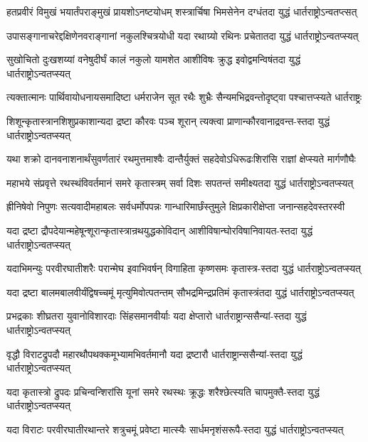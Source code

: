 \twolineshloka
{हतप्रवीरं विमुखं भयार्तंपराङ्मुखं प्रायशोऽनष्टयोधम्}
{शस्त्रार्चिषा भिमसेनेन दग्धंतदा युद्धं धार्तराष्ट्रोऽन्वतप्त्सत्}


\twolineshloka
{उपासङ्गानाचरेद्दक्षिणेनवराङ्गानां नकुलश्चित्रयोधी}
{यदा रथाग्र्यो रथिनः प्रचेतातदा युद्धं धार्तराष्ट्रोऽन्वतप्स्यत्}


\twolineshloka
{सुखोचितो दुःखशय्यां वनेषुदीर्घं कालं नकुलो यामशेत}
{आशीविषः क्रुद्ध इवोद्वमन्विषंतदा युद्धं धार्तराष्ट्रोऽन्वतप्स्यत्}


\twolineshloka
{त्यक्तात्मानः पार्थिवायोधनायसमादिष्टा धर्मराजेन सूत}
{रथैः शुभ्रैः सैन्यमभिद्रवन्तोदृष्ट्वा पश्चात्तप्स्यते धार्तराष्ट्रः}


\twolineshloka
{शिशून्कृतास्त्रानशिशुप्रकाशान्यदा द्रष्टा कौरवः पञ्च शूरान्}
{त्यक्त्वा प्राणान्कौरवानाद्रवन्त-स्तदा युद्धं धार्तराष्ट्रोऽन्वतप्स्यत्}


\twolineshloka
{यथा शक्रो दानवनाशनार्थंसुवर्णतारं रथमुत्तमाश्वैः}
{दान्तैर्युक्तं सहदेवोऽधिरूढःशिरांसि राज्ञां क्षेप्स्यते मार्गणौघैः}


\twolineshloka
{महाभये संप्रवृत्ते रथस्थंविवर्तमानं समरे कृतास्त्रम्}
{सर्वा दिशः सपतन्तं समीक्ष्यतदा युद्धं धार्तराष्ट्रोऽन्वतप्स्यत्}


\twolineshloka
{ह्रीनिषेवो निपुणः सत्यवादीमहाबलः सर्वधर्मोपपन्नः}
{गान्धारिमार्छंस्तुमुले क्षिप्रकारीक्षेप्ता जनान्सहदेवस्तरस्वी}


\twolineshloka
{यदा द्रष्टा द्रौपदेयान्महेषून्शूरान्कृतास्त्रान्रथयुद्धकोविदान्}
{आशीविषान्घोरविषानिवायत-स्तदा युद्धं धार्तराष्ट्रोऽन्वतप्स्यत्}


\twolineshloka
{यदाभिमन्युः परवीरघातीशरैः परान्मेघ इवाभिवर्षन्}
{विगाहिता कृष्णसमः कृतास्त्र-स्तदा युद्धं धार्तराष्ट्रोऽन्वतप्स्यत्}


\twolineshloka
{यदा द्रष्टा बालमबालवीर्यंद्विषच्चमूं मृत्युमिवोत्पतन्तम्}
{सौभद्रमिन्द्रप्रतिमं कृतास्त्रंतदा युद्धं धार्तराष्ट्रोऽन्वतप्स्यत्}


\twolineshloka
{प्रभद्रकाः शीघ्रतरा युवानोविशारदाः सिंहसमानवीर्याः}
{यदा क्षेप्तारो धार्तराष्ट्रान्ससैन्यां-स्तदा युद्धं धार्तराष्ट्रोऽन्वतप्स्यत्}


\twolineshloka
{वृद्धौ विराटद्रुपदौ महारथौपथक्कमूभ्यामभिवर्तमानौ}
{यदा द्रष्टारौ धार्तराष्ट्रान्ससैन्यां-स्तदा युद्धं धार्तराष्ट्रोऽन्वतप्स्यत्}


\twolineshloka
{यदा कृतास्त्रो द्रुपदः प्रचिन्वन्शिरांसि यूनां समरे रथस्थः}
{क्रूद्धः शरैश्छेत्स्यति चापमुक्तै-स्तदा युद्धं धार्तराष्ट्रोऽन्वतप्स्यत्}


\twolineshloka
{यदा विराटः परवीरघातीरथान्तरे शत्रुचमूं प्रवेष्टा}
{मात्स्यैः सार्धमनृशंसरूपै-स्तदा युद्धं धार्तराष्ट्रोऽन्वतप्स्यत्}


